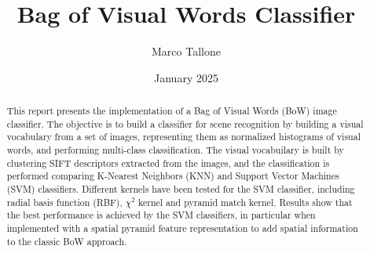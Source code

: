 \documentclass{settings/notex}
\title{
  Bag of Visual Words Classifier\\
  \vspace{0.35cm}
  \fontsize{12pt}{12pt}\selectfont{
    Computer Vision and Pattern Recognition Exam\\
    \vspace{0.25cm}
    University of Trieste (UniTS)
  }
}
\author{Marco Tallone}
\date{January 2025}
\begin{document}
\maketitle

\begin{abstract}
\noindent
This report presents the implementation of a Bag of Visual Words (BoW) image classifier.
The objective is to build a classifier for scene recognition by building a visual vocabulary from a set of images, representing them as normalized histograms of visual words, and performing multi-class classification.
The visual vocabuilary is built by clustering SIFT descriptors extracted from the images, and the classification is performed comparing K-Nearest Neighbors (KNN) and Support Vector Machines (SVM) classifiers.
Different kernels have been tested for the SVM classifier, including radial basis function (RBF), $\chi^2$ kernel and pyramid match kernel.
Results show that the best performance is achieved by the SVM classifiers, in particular when implemented with a spatial pyramid feature representation to add spatial information to the classic BoW approach.
\end{abstract}










\pagebreak



\pagebreak
\appendix
\renewcommand{\thesection}{\Alph{section}} %
\renewcommand{\thesubsection}{\thesection\arabic{subsection}} %

\end{document}
